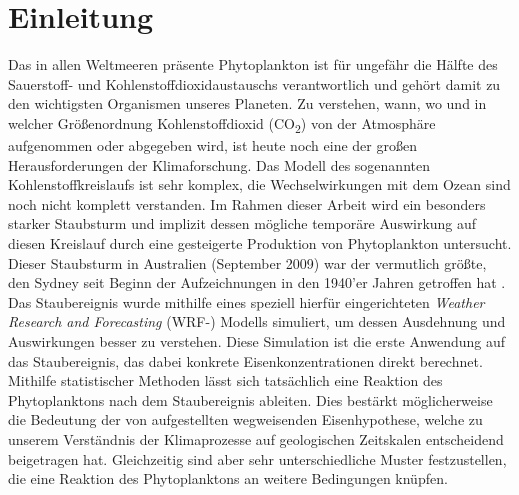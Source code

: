 \documentclass[12pt,a4paper,onecolumn,headheight=30pt]{scrartcl}
\newcommand{\cotwo}{CO\textsubscript{2}}
\begin{document}
\section{Einleitung} \label{sec:einleitung}
Das in allen Weltmeeren präsente Phytoplankton ist für ungefähr die Hälfte des Sauerstoff- und Kohlenstoffdioxidaustauschs verantwortlich \citep{Emerson.2009} und gehört damit zu den wichtigsten Organismen unseres Planeten. Zu verstehen, wann, wo und in welcher Größenordnung Kohlenstoffdioxid (\cotwo) von der Atmosphäre aufgenommen oder abgegeben wird, ist heute noch eine der großen Herausforderungen der Klimaforschung. Das Modell des sogenannten Kohlenstoffkreislaufs ist sehr komplex, die Wechselwirkungen mit dem Ozean sind noch nicht komplett verstanden. Im Rahmen dieser Arbeit wird ein besonders starker Staubsturm und implizit dessen mögliche temporäre Auswirkung auf diesen Kreislauf durch eine gesteigerte Produktion von Phytoplankton untersucht. Dieser Staubsturm in Australien (September 2009) war der vermutlich größte, den Sydney seit Beginn der Aufzeichnungen in den 1940'er Jahren getroffen hat \citep{Leys.2011}. Das Staubereignis wurde mithilfe eines speziell hierfür eingerichteten \textit{Weather Research and Forecasting} (WRF-) Modells simuliert, um dessen Ausdehnung und Auswirkungen besser zu verstehen. Diese Simulation ist die erste Anwendung auf das Staubereignis, das dabei konkrete Eisenkonzentrationen direkt berechnet. Mithilfe statistischer Methoden lässt sich tatsächlich eine Reaktion des Phytoplanktons nach dem Staubereignis ableiten. Dies bestärkt möglicherweise die Bedeutung der von \citet{Martin.1990} aufgestellten wegweisenden Eisenhypothese, welche zu unserem Verständnis der Klimaprozesse auf geologischen Zeitskalen entscheidend beigetragen hat. Gleichzeitig sind aber sehr unterschiedliche Muster festzustellen, die eine Reaktion des Phytoplanktons an weitere Bedingungen knüpfen.\\
\end{document}
